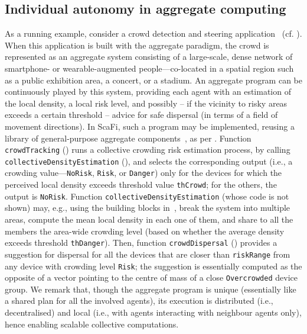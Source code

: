 \subsection{Individual autonomy in aggregate computing}
\label{contrib-individual-autonomy}

As a running example, consider a crowd detection and steering application~\cite{DBLP:journals/computer/BealPV15} (cf. ).
%
When this application is built with the aggregate paradigm, the crowd is represented as an aggregate system consisting of 
 a large-scale, dense network of smartphone- or wearable-augmented people---co-located in a spatial region such as a public exhibition area, a concert, or a stadium.
%
An aggregate program can be continuously played by this system,
 providing each agent with 
 an estimation of the local density,
 a local risk level,
 and possibly -- if the vicinity to risky areas exceeds a certain threshold -- advice for safe dispersal (in terms of a field of movement directions).
%
In ScaFi, such a program may be implemented, reusing a library of general-purpose aggregate components~\cite{DBLP:conf/saso/BealV14a}, %
 as per . 
%
Function \lstinline|crowdTracking| ()
 runs
 a collective crowding risk estimation process,
 by calling \lstinline|collectiveDensityEstimation| (),
 and selects the corresponding output (i.e., a crowding value---\lstinline|NoRisk|, \lstinline|Risk|, or \lstinline|Danger|)
 only for the devices for which the perceived local density
 exceeds threshold value \lstinline|thCrowd|;
 for the others, the output is \lstinline|NoRisk|.
%
Function \lstinline|collectiveDensityEstimation| (whose code is not shown)
 may, e.g., using the building blocks in~\cite{DBLP:conf/saso/BealV14a}, break the system into multiple areas, compute the mean local density in each one of them, and share to all the members the area-wide crowding level (based on whether the average density exceeds threshold \lstinline|thDanger|).
%
Then, function \lstinline|crowdDispersal| ()
 provides a suggestion for dispersal
 for all the devices that are closer than \lstinline|riskRange|
 from any device with crowding level \lstinline|Risk|;
 the suggestion is essentially computed as the opposite
 of a vector pointing to the centre of mass of a close 
 \lstinline|Overcrowded| device group.
%
We remark that, 
 though the aggregate program is unique (essentially like a shared plan for all the involved agents),
 its execution is distributed (i.e., decentralised)
 and local (i.e., with agents interacting with neighbour agents only),
 hence enabling scalable collective computations.
 

